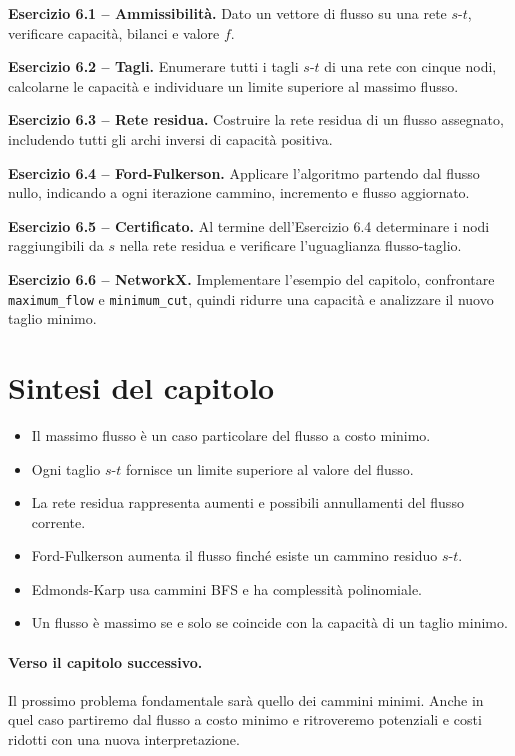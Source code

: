 \documentclass[11pt,a4paper]{article}
\begin{document}
\textbf{Esercizio 6.1 -- Ammissibilità.}
Dato un vettore di flusso su una rete $s$-$t$, verificare capacità, bilanci e valore $f$.

\medskip\textbf{Esercizio 6.2 -- Tagli.}
Enumerare tutti i tagli $s$-$t$ di una rete con cinque nodi, calcolarne le capacità e individuare un limite superiore al massimo flusso.

\medskip\textbf{Esercizio 6.3 -- Rete residua.}
Costruire la rete residua di un flusso assegnato, includendo tutti gli archi inversi di capacità positiva.

\medskip\textbf{Esercizio 6.4 -- Ford-Fulkerson.}
Applicare l'algoritmo partendo dal flusso nullo, indicando a ogni iterazione cammino, incremento e flusso aggiornato.

\medskip\textbf{Esercizio 6.5 -- Certificato.}
Al termine dell'Esercizio 6.4 determinare i nodi raggiungibili da $s$ nella rete residua e verificare l'uguaglianza flusso-taglio.

\medskip\textbf{Esercizio 6.6 -- NetworkX.}
Implementare l'esempio del capitolo, confrontare \texttt{maximum\_flow} e \texttt{minimum\_cut}, quindi ridurre una capacità e analizzare il nuovo taglio minimo.

\section{Sintesi del capitolo}
\begin{learningbox}
\begin{itemize}[nosep]
\item Il massimo flusso è un caso particolare del flusso a costo minimo.
\item Ogni taglio $s$-$t$ fornisce un limite superiore al valore del flusso.
\item La rete residua rappresenta aumenti e possibili annullamenti del flusso corrente.
\item Ford-Fulkerson aumenta il flusso finché esiste un cammino residuo $s$-$t$.
\item Edmonds-Karp usa cammini BFS e ha complessità polinomiale.
\item Un flusso è massimo se e solo se coincide con la capacità di un taglio minimo.
\end{itemize}
\end{learningbox}

\paragraph{Verso il capitolo successivo.}
Il prossimo problema fondamentale sarà quello dei cammini minimi. Anche in quel caso partiremo dal flusso a costo minimo e ritroveremo potenziali e costi ridotti con una nuova interpretazione.
\end{document}

